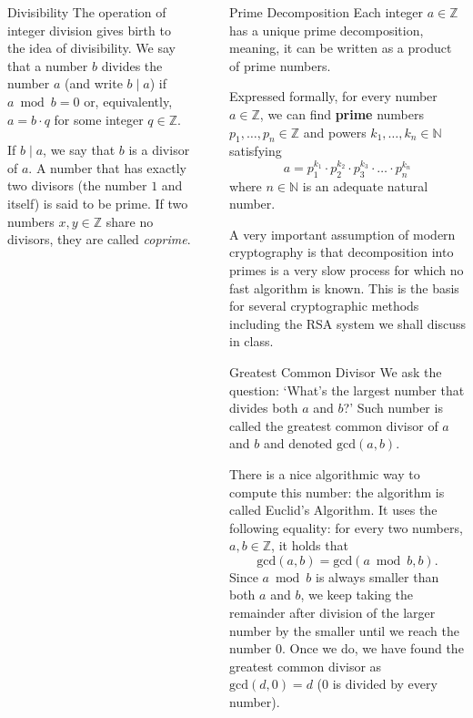 \documentclass[final]{beamer}
\newlength{\sepwidth}
\newlength{\colwidth}
\newcommand{\separatorcolumn}{\begin{column}{\sepwidth}\end{column}}
\newcommand{\N}{\mathbb{N}}
\newcommand{\Z}{\mathbb{Z}}
\begin{document}
\begin{frame}[t]
\begin{columns}[t]
\begin{column}{\colwidth}
\begin{alertblock}{Divisibility}
 The operation of integer division gives birth to the idea of
 \alert{divisibility}. We say that a number $b$ \alert{divides} the number $a$
 (and write $b \mid a$) if $a \bmod b = 0$ or, equivalently, $a = b \cdot q$ for
 some integer $q \in \Z$. 

 If $b \mid a$, we say that $b$ is a \alert{divisor} of $a$. A number that
 \alert{has exactly two divisors} (the number $1$ and itself) is said to be
 \alert{prime}. If two numbers $x,y \in \Z$ \alert{share no divisors}, they are
 called \emph{coprime}.
\end{alertblock}

\end{column}
\separatorcolumn

\begin{column}{\colwidth}

\begin{block}{Prime Decomposition}
 Each integer $a \in \Z$ has a \alert{unique prime decomposition}, meaning, it
 can be written as a \alert{product of prime numbers}.

 Expressed formally, for every number $a \in \Z$, we can find \textbf{prime}
 numbers $p_1,\ldots,p_n \in \Z$ and powers $k_1,\ldots,k_n \in \N$ satisfying
 \[
  a = p_1^{k_1} \cdot p_2^{k_2} \cdot p_3^{k_3} \cdot \ldots \cdot p_n^{k_n}
 \]
 where $n \in \N$ is an adequate natural number.

 A very important assumption of modern cryptography is that decomposition into
 primes is a very slow process for which no fast algorithm is known. This is the
 basis for several cryptographic methods including the RSA system we shall
 discuss in class.
\end{block}

\begin{exampleblock}{Greatest Common Divisor}
 We ask the question: `What's the \alert{largest number that divides} both $a$
 and $b$?' Such number is called the \alert{greatest common divisor} of $a$ and
 $b$ and denoted $\mathrm{gcd}(a,b)$.

 There is a nice \alert{algorithmic way} to compute this number: the algorithm
 is called \alert{Euclid's Algorithm}. It uses the following equality: for every
 two numbers, $a,b \in \Z$, it holds that
 \[
  \mathrm{gcd}(a,b) = \mathrm{gcd}(a \bmod b, b).
 \]
 Since $a \bmod b$ is always smaller than both $a$ and $b$, we keep taking the
 remainder after division of the larger number by the smaller until we reach the
 number $0$. Once we do, we have found the greatest common divisor as
 $\mathrm{gcd}(d,0) = d$ ($0$ is divided by every number).


\end{exampleblock}
\end{column}
\end{columns}
\end{frame}
\end{document}
